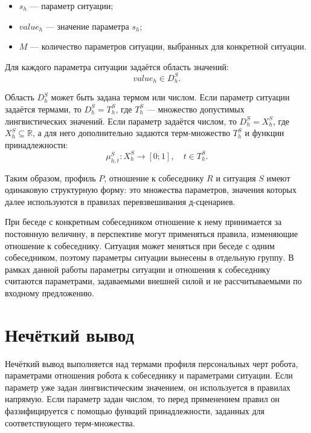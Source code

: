 \begin{itemize}
	\item \(s_h\) --- параметр ситуации;
	\item \(value_h\) --- значение параметра \(s_h\);
	\item \(M\) --- количество параметров ситуации, выбранных для конкретной ситуации.
\end{itemize}

Для каждого параметра ситуации задаётся область значений:
\begin{equation}
	\label{eq:situation_domain}
	value_h \in D^S_h.
\end{equation}

Область \(D^S_h\) может быть задана термом или числом.
Если параметр ситуации задаётся термами, то \(D^S_h = T^S_h\), где \(T^S_h\) --- множество допустимых лингвистических значений.
Если параметр задаётся числом, то \(D^S_h = X^S_h\), где \(X^S_h \subseteq \mathbb{R}\), а для него дополнительно задаются терм-множество \(T^S_h\) и функции принадлежности:
\begin{equation}
	\label{eq:situation_membership}
	\mu^S_{h,t}: X^S_h \rightarrow [0; 1], \quad t \in T^S_h.
\end{equation}

Таким образом, профиль \(P\), отношение к собеседнику \(R\) и ситуация \(S\) имеют одинаковую структурную форму: это множества параметров, значения которых далее используются в правилах перевзвешивания д-сценариев.

При беседе с конкретным собеседником отношение к нему принимается за постоянную величину, в перспективе могут применяться правила, изменяющие отношение к собеседнику.
Ситуация может меняться при беседе с одним собеседником, поэтому параметры ситуации вынесены в отдельную группу.
В рамках данной работы параметры ситуации и отношения к собеседнику считаются параметрами, задаваемыми внешней силой и не рассчитываемыми по входному предложению.

\section{Нечёткий вывод}

Нечёткий вывод выполняется над термами профиля персональных черт робота, параметрами отношения робота к собеседнику и параметрами ситуации.
Если параметр уже задан лингвистическим значением, он используется в правилах напрямую.
Если параметр задан числом, то перед применением правил он фаззифицируется с помощью функций принадлежности, заданных для соответствующего терм-множества.

